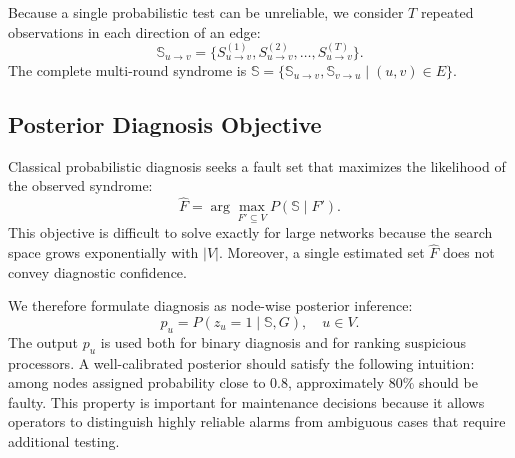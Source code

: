 Because a single probabilistic test can be unreliable, we consider $T$ repeated observations in each direction of an edge:
\begin{equation*}
\mathbb{S}_{u\rightarrow v}=\{S_{u\rightarrow v}^{(1)},S_{u\rightarrow v}^{(2)},\ldots,S_{u\rightarrow v}^{(T)}\}.
\end{equation*}
The complete multi-round syndrome is $\mathbb{S}=\{\mathbb{S}_{u\rightarrow v},\mathbb{S}_{v\rightarrow u}\mid (u,v)\in E\}$.

\subsection{Posterior Diagnosis Objective}
Classical probabilistic diagnosis seeks a fault set that maximizes the likelihood of the observed syndrome:
\begin{equation*}
\hat{F}=\arg\max_{F'\subseteq V} P(\mathbb{S}\mid F').
\end{equation*}
This objective is difficult to solve exactly for large networks because the search space grows exponentially with $|V|$. Moreover, a single estimated set $\hat{F}$ does not convey diagnostic confidence.

We therefore formulate diagnosis as node-wise posterior inference:
\begin{equation*}
p_u=P(z_u=1\mid \mathbb{S},G), \quad u\in V.
\end{equation*}
The output $p_u$ is used both for binary diagnosis and for ranking suspicious processors. A well-calibrated posterior should satisfy the following intuition: among nodes assigned probability close to $0.8$, approximately $80\%$ should be faulty. This property is important for maintenance decisions because it allows operators to distinguish highly reliable alarms from ambiguous cases that require additional testing.
